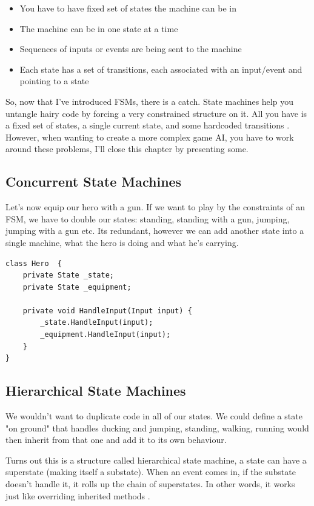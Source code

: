 \documentclass[a4paper, 12pt]{book}
\begin{document}
\begin{itemize}
    \item You have to have fixed set of states the machine can be in
    \item The machine can be in one state at a time
    \item Sequences of inputs or events are being sent to the machine
    \item Each state has a set of transitions, each associated  with an input/event and pointing to a state
\end{itemize}

So, now that I've introduced FSMs, there is a catch. State machines help you untangle hairy code by forcing a very constrained structure on it. All you have is a fixed set of states, a single current state, and some hardcoded transitions \cite{GameProgrammingPattersFMS}. However, when wanting to create a more complex game AI, you have to work around these problems, I'll close this chapter by presenting some. 

\subsection{Concurrent State Machines}

Let's now equip our hero with a gun. If we want to play by the constraints of an FSM, we have to double our states: standing, standing with a gun, jumping, jumping with a gun etc. Its redundant, however we can add another state into a single machine, what the hero is doing and what he's carrying.

\begin{verbatim}
class Hero  {
    private State _state;
    private State _equipment;

    private void HandleInput(Input input) {
        _state.HandleInput(input);
        _equipment.HandleInput(input);
    }
}
\end{verbatim}

\subsection{Hierarchical State Machines}

We wouldn't want to duplicate code in all of our states. We could define a state "on ground" that handles ducking and jumping, standing, walking, running would then inherit from that one and add it to its own behaviour.

Turns out this is a structure called hierarchical state machine, a state can have a superstate (making itself a substate). When an event comes in, if the substate doesn’t handle it, it rolls up the chain of superstates. In other words, it works just like overriding inherited methods \cite{GameProgrammingPattersFMS}.
\end{document}
